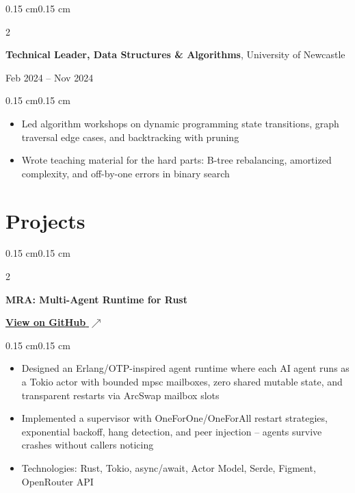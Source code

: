 \documentclass[10pt, letterpaper]{article}
\newcommand{\githublink}[2]{\href{#1}{#2 $\nearrow$}}
\newenvironment{highlights}{
    \begin{itemize}[
        topsep=0.08 cm,
        parsep=0.05 cm,
        partopsep=0pt,
        itemsep=0pt,
        leftmargin=0.4 cm
    ]
}{
    \end{itemize}
}
\newenvironment{onecolentry}{
    \begin{adjustwidth}{0.15 cm}{0.15 cm}
}{
    \end{adjustwidth}
}
\newenvironment{twocolentry}[2][]{
    \onecolentry
    \def\secondColumn{#2}
    \setcolumnwidth{\fill, 4.5 cm}
    \begin{paracol}{2}
}{
    \switchcolumn \raggedleft \secondColumn
    \end{paracol}
    \endonecolentry
}
\begin{document}
        \vspace{0.15 cm}

        \begin{twocolentry}{
            Feb 2024 -- Nov 2024
        }
            \textbf{Technical Leader, Data Structures \& Algorithms}, University of Newcastle
        \end{twocolentry}
        \vspace{0.10 cm}
        \begin{onecolentry}
            \begin{highlights}
                \item Led algorithm workshops on dynamic programming state transitions, graph traversal edge cases, and backtracking with pruning
                \item Wrote teaching material for the hard parts: B-tree rebalancing, amortized complexity, and off-by-one errors in binary search
            \end{highlights}
        \end{onecolentry}

    \section{Projects}

        \begin{twocolentry}{
            \githublink{https://github.com/yuann3/mra}{\textbf{View on GitHub}}
        }
            \textbf{MRA: Multi-Agent Runtime for Rust}
        \end{twocolentry}
        \vspace{0.08 cm}
        \begin{onecolentry}
            \begin{highlights}
                \item Designed an Erlang/OTP-inspired agent runtime where each AI agent runs as a Tokio actor with bounded mpsc mailboxes, zero shared mutable state, and transparent restarts via ArcSwap mailbox slots
                \item Implemented a supervisor with OneForOne/OneForAll restart strategies, exponential backoff, hang detection, and peer injection -- agents survive crashes without callers noticing
                \item Technologies: Rust, Tokio, async/await, Actor Model, Serde, Figment, OpenRouter API
            \end{highlights}
        \end{onecolentry}
\end{document}

